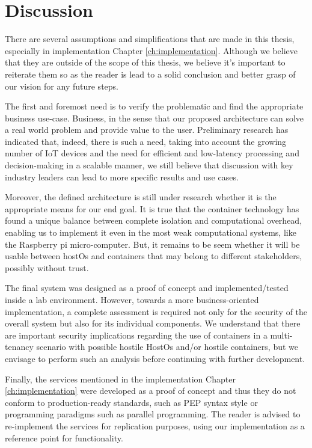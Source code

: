 \chapter{Discussion} \label{ch:discussion}

There are several assumptions and simplifications that are made in this thesis, especially in implementation Chapter \ref{ch:implementation}. Although we believe that they are outside of the scope of this thesis, we believe it’s important to reiterate them so as the reader is lead to a solid conclusion and better grasp of our vision for any future steps.

The first and foremost need is to verify the problematic and find the appropriate business use-case. Business, in the sense that our proposed architecture can solve a real world problem and provide value to the user. Preliminary research has indicated that, indeed, there is such a need, taking into account the growing number of IoT devices and the need for efficient and low-latency processing and decision-making in a scalable manner, we still believe that discussion with key industry leaders can lead to more specific results and use cases.

Moreover, the defined architecture is still under research whether it is the appropriate means for our end goal. It is true that the container technology has found a unique balance between complete isolation and computational overhead, enabling us to implement it even in the most weak computational systems, like the  Raspberry pi micro-computer. But, it remains to be seem whether it will be usable between hostOs and containers that may belong to different stakeholders, possibly without trust.

The final system was designed as a proof of concept and implemented/tested inside a lab environment. However, towards a more business-oriented implementation, a complete assessment is required not only for the security of the overall system but also for its individual components. We understand that there are important security implications regarding the use of containers in a multi-tenancy scenario with possible hostile HostOs and/or hostile containers, but we envisage to perform such an analysis before continuing with further development.

Finally, the services mentioned in the implementation Chapter \ref{ch:implementation} were developed as a proof of concept and thus they do not conform to production-ready standards, such as PEP syntax style or programming paradigms such as parallel programming. The reader is advised to re-implement the services for replication purposes, using our implementation as a reference point for functionality.


